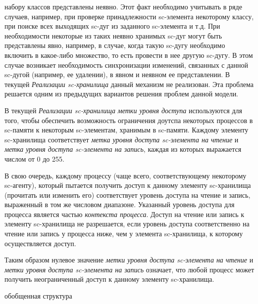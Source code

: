 \begin{scnitemize}
    набору классов представлены неявно. Этот факт необходимо учитывать в ряде случаев, например, при проверке принадлежности
    sc-элемента некоторому классу, при поиске всех выходящих sc-дуг из заданного sc-элемента и т.д.
    При необходимости некоторые из таких неявно хранимых sc-дуг могут быть представлены явно, например, в случае, когда
    такую sc-дугу необходимо включить в какое-либо множество, то есть провести в нее другую sc-дугу. В этом случае возникает
    необходимость синхронизации изменений, связанных с данной sc-дугой (например, ее удалении), в явном и неявном ее
    представлении. В текущей \textit{Реализации sc-хранилища} данный механизм не реализован. Эта проблема решается
    одним из предыдущих вариантов решения проблем данной модели.
\end{scnitemize}

В текущей \textit{Реализации sc-хранилища} \textit{метки уровня доступа} используются для того, чтобы обеспечить
возможность ограничения доутспа некоторых процессов в sc-памяти к некоторым sc-элементам, хранимым в sc-памяти.
Каждому элементу sc-хранилища соответствует \textit{метка уровня доступа sc-элемента на чтение} и \textit{метка уровня
доступа sc-элемента на запись}, каждая из которых выражается числом от 0 до 255.

В свою очередь, каждому процессу (чаще всего, соответствующему некоторому sc-агенту), который пытается получить доступ к
данному элементу sc-хранилища (прочитать или изменить его) соответствует уровень доступа на чтение и запись, выраженный
в том же числовом диапазоне. Указанный уровень доступа для процесса является частью \textit{контекста процесса}. Доступ
на чтение или запись к элементу sc-хранилища не разрешается, если уровень доступа соответственно на чтение или запись
у процесса ниже, чем у элемента sc-хранилища, к которому осуществляется доступ.

Таким образом нулевое значение \textit{метки уровня доступа sc-элемента на чтение} и \textit{метки уровня доступа
sc-элемента на запись} означает, что любой процесс может получить неограниченный доступ к данному элементу sc-хранилища.

\begin{SCn}
\begin{scnrelfromset}{обобщенная структура}
\end{scnrelfromset}
\end{SCn}

